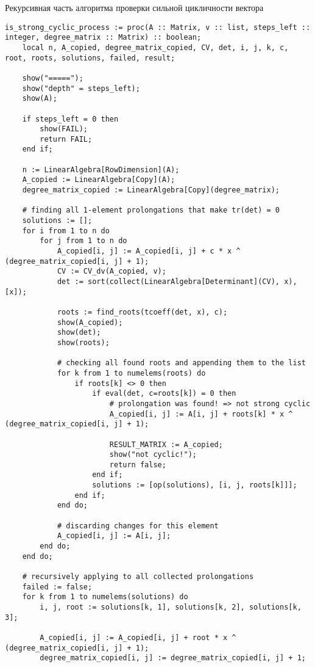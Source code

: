 Рекурсивная часть алгоритма проверки сильной цикличности вектора
\begin{lstlisting}[basicstyle=\scriptsize]
is_strong_cyclic_process := proc(A :: Matrix, v :: list, steps_left :: integer, degree_matrix :: Matrix) :: boolean;
    local n, A_copied, degree_matrix_copied, CV, det, i, j, k, c, root, roots, solutions, failed, result;

    show("=====");
    show("depth" = steps_left);
    show(A);
    
    if steps_left = 0 then
        show(FAIL);
        return FAIL;
    end if;
    
    n := LinearAlgebra[RowDimension](A);
    A_copied := LinearAlgebra[Copy](A);
    degree_matrix_copied := LinearAlgebra[Copy](degree_matrix);
    
    # finding all 1-element prolongations that make tr(det) = 0
    solutions := [];
    for i from 1 to n do
        for j from 1 to n do
            A_copied[i, j] := A_copied[i, j] + c * x ^ (degree_matrix_copied[i, j] + 1);
            CV := CV_dv(A_copied, v);
            det := sort(collect(LinearAlgebra[Determinant](CV), x), [x]);
            
            roots := find_roots(tcoeff(det, x), c);
            show(A_copied);
            show(det);
            show(roots);
            
            # checking all found roots and appending them to the list
            for k from 1 to numelems(roots) do
                if roots[k] <> 0 then
                    if eval(det, c=roots[k]) = 0 then
                        # prolongation was found! => not strong cyclic
                        A_copied[i, j] := A[i, j] + roots[k] * x ^ (degree_matrix_copied[i, j] + 1);
                        
                        RESULT_MATRIX := A_copied;
                        show("not cyclic!");
                        return false;
                    end if;
                    solutions := [op(solutions), [i, j, roots[k]]];
                end if;
            end do;
            
            # discarding changes for this element
            A_copied[i, j] := A[i, j];
        end do;
    end do;
    
    # recursively applying to all collected prolongations
    failed := false;
    for k from 1 to numelems(solutions) do
        i, j, root := solutions[k, 1], solutions[k, 2], solutions[k, 3];
        
        A_copied[i, j] := A_copied[i, j] + root * x ^ (degree_matrix_copied[i, j] + 1);
        degree_matrix_copied[i, j] := degree_matrix_copied[i, j] + 1;
        

\end{lstlisting}
